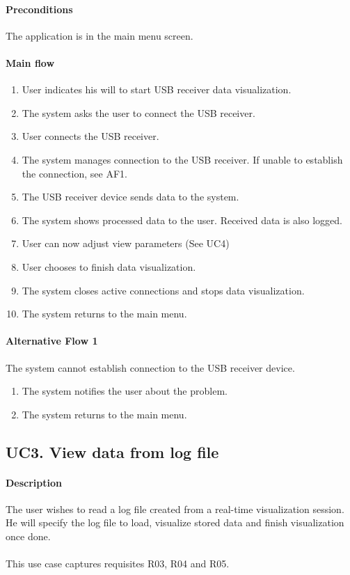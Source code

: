 			\paragraph{Preconditions} The application is in the main menu screen.
			\paragraph{Main flow}
				\begin{enumerate}
				\item User indicates his will to start USB receiver data visualization.
				\item The system asks the user to connect the USB receiver.
				\item User connects the USB receiver.
				\item The system manages connection to the USB receiver. If unable to establish the connection, see AF1.
				\item The USB receiver device sends data to the system.
				\item The system shows processed data to the user. Received data is also logged.
				\item User can now adjust view parameters (See UC4)
				\item User chooses to finish data visualization.
				\item The system closes active connections and stops data visualization.
				\item The system returns to the main menu.
				\end{enumerate}

			\paragraph{Alternative Flow 1} The system cannot establish connection to the USB receiver device.
				\begin{enumerate}
				\item The system notifies the user about the problem.
				\item The system returns to the main menu.
				\end{enumerate}

		\subsection{UC3. View data from log file}

			\paragraph{Description} The user wishes to read a log file created from a real-time visualization session. He will specify the log file to load, visualize stored data and finish visualization once done.\\
			\\This use case captures requisites R03, R04 and R05.

